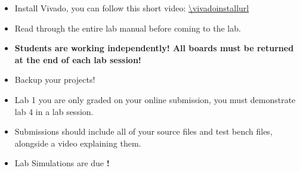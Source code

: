 \begin{itemize}
    \item Install Vivado, you can follow this short video: \url{\vivadoinstallurl}
    \item Read through the entire lab manual before coming to the lab.
    \item \textbf{Students are working independently! All boards must be returned at the end of each lab session!}
    \item Backup your projects!
    \item Lab 1 you are only graded on your online submission, you must demonstrate lab 4 in a lab session. 
    \item Submissions should include all of your source files and test bench files, alongside a video explaining them. 
    \item Lab Simulations are due \textbf{\labonesimsdue!}
    
\end{itemize}